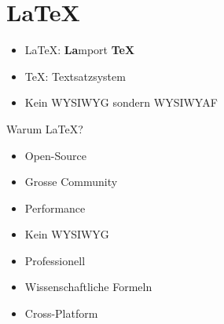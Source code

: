 \section{\LaTeX}

{
\begin{frame}

\end{frame}
}

\begin{frame}
	\begin{itemize}
		\item \LaTeX: \textbf{La}mport \textbf{TeX} 
		\item TeX: Textsatzsystem 
		\item Kein WYSIWYG sondern WYSIWYAF
	\end{itemize}
\end{frame}

\begin{frame}{Warum \LaTeX?}
\begin{itemize}
	\item Open-Source 
	\item Grosse Community 
	\item Performance 
	\item Kein WYSIWYG 
	\item Professionell 
	\item Wissenschaftliche Formeln 
	\item Cross-Platform
\end{itemize}
\end{frame}

